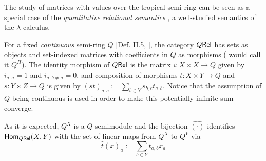 
The study of matrices with values over the tropical semi-ring can be seen as a special case of the
\emph{quantitative relational semantics} \cite{Manzo2013}, a well-studied semantics of the $\lambda$-calculus. 

For a fixed \emph{continuous} semi-ring $Q$ [Def. II.5, \cite{Manzo2013}], the category $Q \mathsf{Rel}$ has sets as objects and set-indexed matrices with coefficients in $Q$ as morphisms (\cite{Manzo2013} would call it $Q^\Pi$).
The identity morphism of $Q \mathsf{Rel}$ is the matrix $i:X\times X\to Q$ given by $i_{a,a}=1$ and $i_{a,b\neq a}=0$, and composition of morphisms $t:X\times Y\to Q$ and $s:Y\times Z\to Q$ is given by 
$(st)_{a,c}:=\sum\limits_{b\in Y} s_{b,c}t_{a,b}$.
Notice that the assumption of $Q$ being continuous 
 is used in order to make this potentially infinite sum converge.
 
 As it is expected, $Q^X$ is a $Q$-semimodule and the bijection $\hat{(\cdot)}$ identifies $\mathsf{Hom}_{Q \mathsf{Rel}}(X,Y)$ with the set of linear maps from $Q^X$ to $Q^Y$ via
 \begin{equation}
 \hat t(x)_a:=\sum\limits_{b\in Y} t_{a,b}x_a
 \end{equation}
 
